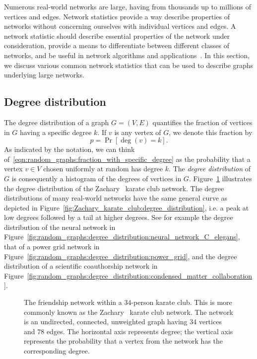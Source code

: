Numerous real-world networks are large, having from thousands up to
millions of vertices and edges. Network statistics provide a way
describe properties of networks without concerning ourselves with
individual vertices and edges. A network statistic should describe
essential properties of the network under consideration, provide a
means to differentiate between different classes of networks, and be
useful in network algorithms and
applications~\cite{BrinkmeierSchank2005}. In this section, we discuss
various common network statistics that can be used to describe graphs
underlying large networks.



\subsection{Degree distribution}
\label{subsec:random_graphs:degree_distribution}

The degree distribution of a graph $G = (V,E)$ quantifies the fraction
of vertices in $G$ having a specific degree $k$. If $v$ is any vertex
of $G$, we denote this fraction by
\begin{equation}
\label{eqn:random_graphs:fraction_with_specific_degree}
p = \Pr[\deg(v) = k].
\end{equation}
As indicated by the notation, we can think
of~\eqref{eqn:random_graphs:fraction_with_specific_degree} as the
probability that a vertex $v \in V$ chosen uniformly at random has
degree $k$. The \emph{degree distribution}
of $G$ is consequently a histogram of the degrees of vertices in
$G$. Figure~\ref{fig:random_graphs:Zachary_karate_club} illustrates
the degree distribution of the
Zachary~\cite{Zachary1977} karate
club network. The degree distributions of many real-world networks
have the same general curve as depicted in
Figure~\ref{fig:Zachary_karate_club:degree_distribution}, i.e. a peak
at low degrees followed by a tail at higher degrees. See for example
the degree distribution of the neural network in
Figure~\ref{fig:random_graphs:degree_distribution:neural_network_C_elegans},
that of a power grid network in
Figure~\ref{fig:random_graphs:degree_distribution:power_grid}, and the
degree distribution of a scientific coauthorship network in
Figure~\ref{fig:random_graphs:degree_distribution:condensed_matter_collaboration}.

\begin{figure}[!htbp]
\centering
{}

\caption{The friendship network within a $34$-person karate club. This
  is more commonly known as the Zachary~\cite{Zachary1977} karate club
  network. The network is an undirected, connected, unweighted graph
  having $34$ vertices and $78$ edges. The horizontal axis represents
  degree; the vertical axis represents the probability that a vertex
  from the network has the corresponding degree.}
\label{fig:random_graphs:Zachary_karate_club}
\end{figure}

